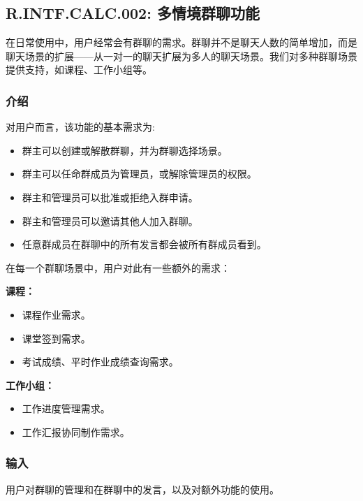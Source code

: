 \subsection{R.INTF.CALC.002: 多情境群聊功能}
在日常使用中，用户经常会有群聊的需求。群聊并不是聊天人数的简单增加，而是聊天场景的扩展——从一对一的聊天扩展为多人的聊天场景。我们对多种群聊场景提供支持，如课程、工作小组等。
\subsubsection{介绍}
对用户而言，该功能的基本需求为:
\begin{itemize}
  \item 群主可以创建或解散群聊，并为群聊选择场景。
  \item 群主可以任命群成员为管理员，或解除管理员的权限。
  \item 群主和管理员可以批准或拒绝入群申请。
  \item 群主和管理员可以邀请其他人加入群聊。
  \item 任意群成员在群聊中的所有发言都会被所有群成员看到。
\end{itemize}

在每一个群聊场景中，用户对此有一些额外的需求：

\textbf{课程：}
\begin{itemize}
  \item 课程作业需求。
  \item 课堂签到需求。
  \item 考试成绩、平时作业成绩查询需求。
\end{itemize}

\textbf{工作小组：}
\begin{itemize}
  \item 工作进度管理需求。
  \item 工作汇报协同制作需求。
\end{itemize}
\subsubsection{输入}
用户对群聊的管理和在群聊中的发言，以及对额外功能的使用。
